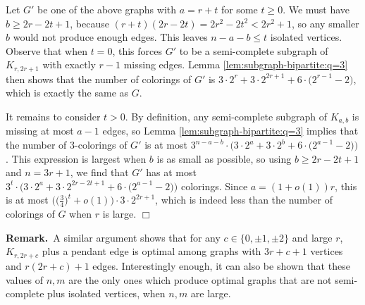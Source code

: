 \documentclass[11pt]{article}
\begin{document}
Let $G'$ be one of the above graphs with $a = r+t$ for some $t \geq
0$.  We must have $b \geq 2r-2t+1$, because $(r+t)(2r-2t) = 2r^2 -
2t^2 < 2r^2 + 1$, so any smaller $b$ would not produce enough edges.
This leaves $n - a - b \leq t$ isolated vertices.  Observe that when
$t=0$, this forces $G'$ to be a semi-complete subgraph of $K_{r,
  2r+1}$ with exactly $r-1$ missing edges.  Lemma
\ref{lem:subgraph-bipartite:q=3} then shows that the number of
colorings of $G'$ is $3 \cdot 2^r + 3 \cdot 2^{2r+1} + 6 \cdot
\big(2^{r-1} - 2\big)$, which is exactly the same as $G$.

It remains to consider $t > 0$.  By definition, any semi-complete
subgraph of $K_{a,b}$ is missing at most $a-1$ edges, so Lemma
\ref{lem:subgraph-bipartite:q=3} implies that the number of
3-colorings of $G'$ is at most $3^{n-a-b} \cdot \big(3 \cdot 2^a + 3
\cdot 2^b + 6 \cdot \big(2^{a-1} - 2\big) \big)$.  This expression is
largest when $b$ is as small as possible, so using $b \geq 2r-2t+1$
and $n = 3r+1$, we find that $G'$ has at most $3^t \cdot \big(3 \cdot
2^a + 3 \cdot 2^{2r-2t+1} + 6 \cdot \big(2^{a-1} - 2\big) \big)$
colorings.  Since $a = (1+o(1))r$, this is at most
$\big(\big(\frac{3}{4}\big)^t + o(1)\big) \cdot 3 \cdot 2^{2r+1}$,
which is indeed less than the number of colorings of $G$ when $r$ is
large.  \hfill $\Box$

\vspace{3mm}

\noindent \textbf{Remark.}\, A similar argument shows that for any $c
\in \{0, \pm 1, \pm 2\}$ and large $r$, $K_{r, 2r+c}$ plus a pendant
edge is optimal among graphs with $3r+c+1$ vertices and $r(2r+c) + 1$
edges.  Interestingly enough, it can also be shown that these values
of $n,m$ are the only ones which produce optimal graphs that are not
semi-complete plus isolated vertices, when $n,m$ are large.
%
%
\end{document}
